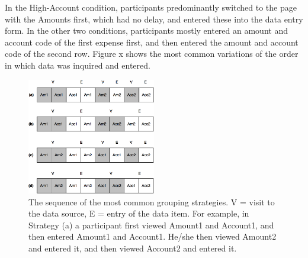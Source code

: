 In the High-Account condition, participants predominantly switched to the page with the Amounts first, which had no delay, and entered these into the data entry form. In the other two conditions, participants mostly entered an amount and account code of the first expense first, and then entered the amount and account code of the second row. Figure x shows the most common variations of the order in which data was inquired and entered.


\begin{figure}[!ht]
  \centering
    \includegraphics[width=0.5\textwidth]{images/ch34/ch34_4-groupstr.png}
      \caption{The sequence of the most common grouping strategies. V = visit to the data source, E = entry of the data item. For example, in Strategy (a) a participant first viewed Amount1 and Account1, and then entered Amount1 and Account1. He/she then viewed Amount2 and entered it, and then viewed Account2 and entered it.}
          \label{fig:ch34_4-groupstr}
\end{figure}

